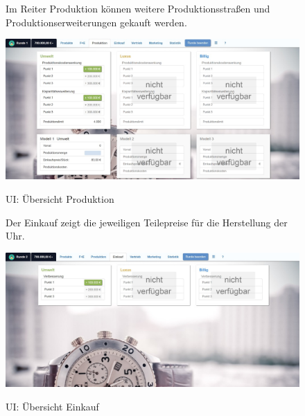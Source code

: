 \begin{figure}
\begin{minipage}{\textwidth}
Im Reiter Produktion können weitere Produktionsstraßen und Produktionserweiterungen gekauft werden.\\
\end{minipage}
	\centering
	\includegraphics[scale=0.3]{img/bilder_layout/produktion.jpeg}
	\label{fig:abb18}
	\caption{UI: Übersicht Produktion} 
\end{figure}

\begin{figure}
\begin{minipage}{\textwidth}
Der Einkauf zeigt die jeweiligen Teilepreise für die Herstellung der Uhr.\\
\end{minipage}
	\centering
	\includegraphics[scale=0.3]{img/bilder_layout/einkauf.jpeg}
	\label{fig:abb19}
	\caption{UI: Übersicht Einkauf} 
\end{figure}

